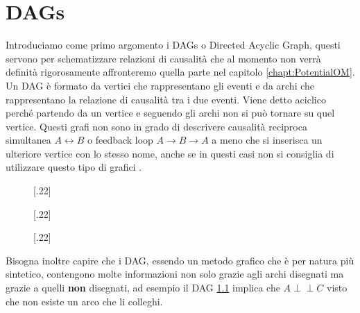 \chapter{DAGs}
\label{chapt:DAGs}

Introduciamo come primo argomento i DAGs o Directed Acyclic Graph, questi servono per schematizzare relazioni di causalità che al momento non verrà   
definità rigorosamente affronteremo quella parte nel capitolo \ref{chapt:PotentialOM}.
Un DAG è formato da vertici che rappresentano gli eventi e da archi che rappresentano la relazione di causalità tra i due eventi. Viene detto aciclico perché partendo da un vertice e seguendo gli archi non si può tornare su  quel vertice. Questi grafi non sono in grado di descrivere causalità reciproca simultanea $A \leftrightarrow B $  o feedback loop $A \rightarrow B \rightarrow A$ a meno che si inserisca un ulteriore vertice con lo stesso nome, anche se in questi casi non si consiglia di utilizzare questo tipo di grafici
\citep{cunningham2021causal}.

\begin{figure}[ht]
  [.22\linewidth]{%
  }%
  [.22\linewidth]{%
  }
  [.22\linewidth]{%
	\label{validDAG}
  }%

\end{figure}
Bisogna inoltre capire che i DAG, essendo un metodo grafico che è per natura più sintetico, contengono molte informazioni non solo grazie agli archi disegnati ma grazie a quelli \textbf{non} disegnati, ad esempio il DAG \ref{validDAG} implica che $A \perp\!\!\!\perp C$ visto che non esiste un arco che li colleghi. %

